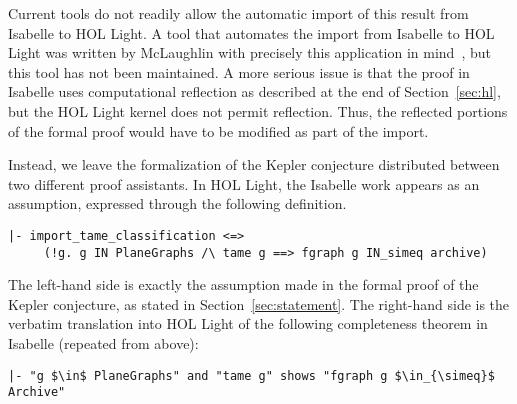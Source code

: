 Current tools do not readily allow the automatic import of this result
from Isabelle to HOL Light.  A tool that automates the import from
Isabelle to HOL Light was written by McLaughlin with precisely this
application in mind~\cite{McLaughlin:2006:IJCAR}, but this tool has
not been maintained.  A more serious issue is that the proof in
Isabelle uses computational reflection as described at the end of
Section~\ref{sec:hl}, but the HOL Light kernel does not permit
reflection.  Thus, the reflected portions of the formal proof would
have to be modified as part of the import.

Instead, we leave the formalization of the Kepler conjecture
distributed between two different proof assistants.  In HOL Light, the
Isabelle work appears as an assumption, expressed through the
following definition.
\begin{obeylines}

\begin{verbatim}
|- import_tame_classification <=>
     (!g. g IN PlaneGraphs /\ tame g ==> fgraph g IN_simeq archive)
\end{verbatim}

\end{obeylines}
The left-hand side is exactly the assumption made in the formal proof
of the Kepler conjecture, as stated in Section~\ref{sec:statement}.
The right-hand side is the verbatim translation into HOL Light of the following
completeness theorem in Isabelle (repeated from above):




\begin{lstlisting}[keepspaces=true,stringstyle=\tt,basicstyle=\small,%
frame=none,framesep=8pt,mathescape,morekeywords={and,shows},columns=flexible]
|- "g $\in$ PlaneGraphs" and "tame g" shows "fgraph g $\in_{\simeq}$ Archive"
\end{lstlisting}


